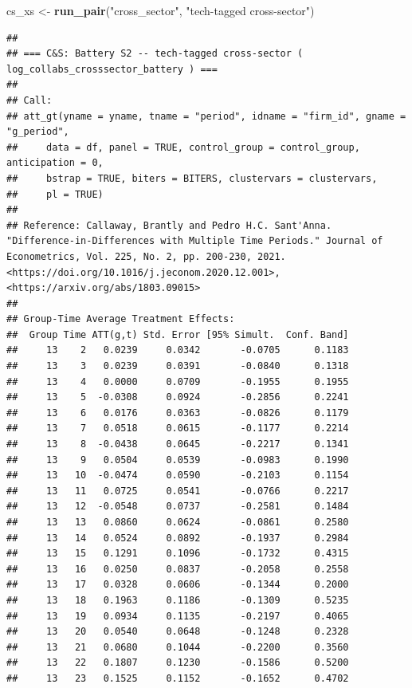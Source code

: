 \documentclass[
]{article}
\newenvironment{Shaded}{\begin{snugshade}}{\end{snugshade}}
\newcommand{\FunctionTok}[1]{\textcolor[rgb]{0.13,0.29,0.53}{\textbf{#1}}}
\newcommand{\NormalTok}[1]{#1}
\newcommand{\OtherTok}[1]{\textcolor[rgb]{0.56,0.35,0.01}{#1}}
\newcommand{\StringTok}[1]{\textcolor[rgb]{0.31,0.60,0.02}{#1}}
\begin{document}
\begin{Shaded}
\begin{Highlighting}[]
\NormalTok{cs\_xs   }\OtherTok{\textless{}{-}} \FunctionTok{run\_pair}\NormalTok{(}\StringTok{"cross\_sector"}\NormalTok{, }\StringTok{"tech{-}tagged cross{-}sector"}\NormalTok{)}
\end{Highlighting}
\end{Shaded}

\begin{verbatim}
## 
## === C&S: Battery S2 -- tech-tagged cross-sector ( log_collabs_crosssector_battery ) ===
## 
## Call:
## att_gt(yname = yname, tname = "period", idname = "firm_id", gname = "g_period", 
##     data = df, panel = TRUE, control_group = control_group, anticipation = 0, 
##     bstrap = TRUE, biters = BITERS, clustervars = clustervars, 
##     pl = TRUE)
## 
## Reference: Callaway, Brantly and Pedro H.C. Sant'Anna.  "Difference-in-Differences with Multiple Time Periods." Journal of Econometrics, Vol. 225, No. 2, pp. 200-230, 2021. <https://doi.org/10.1016/j.jeconom.2020.12.001>, <https://arxiv.org/abs/1803.09015> 
## 
## Group-Time Average Treatment Effects:
##  Group Time ATT(g,t) Std. Error [95% Simult.  Conf. Band]  
##     13    2   0.0239     0.0342       -0.0705      0.1183  
##     13    3   0.0239     0.0391       -0.0840      0.1318  
##     13    4   0.0000     0.0709       -0.1955      0.1955  
##     13    5  -0.0308     0.0924       -0.2856      0.2241  
##     13    6   0.0176     0.0363       -0.0826      0.1179  
##     13    7   0.0518     0.0615       -0.1177      0.2214  
##     13    8  -0.0438     0.0645       -0.2217      0.1341  
##     13    9   0.0504     0.0539       -0.0983      0.1990  
##     13   10  -0.0474     0.0590       -0.2103      0.1154  
##     13   11   0.0725     0.0541       -0.0766      0.2217  
##     13   12  -0.0548     0.0737       -0.2581      0.1484  
##     13   13   0.0860     0.0624       -0.0861      0.2580  
##     13   14   0.0524     0.0892       -0.1937      0.2984  
##     13   15   0.1291     0.1096       -0.1732      0.4315  
##     13   16   0.0250     0.0837       -0.2058      0.2558  
##     13   17   0.0328     0.0606       -0.1344      0.2000  
##     13   18   0.1963     0.1186       -0.1309      0.5235  
##     13   19   0.0934     0.1135       -0.2197      0.4065  
##     13   20   0.0540     0.0648       -0.1248      0.2328  
##     13   21   0.0680     0.1044       -0.2200      0.3560  
##     13   22   0.1807     0.1230       -0.1586      0.5200  
##     13   23   0.1525     0.1152       -0.1652      0.4702  

\end{verbatim}
\end{document}
